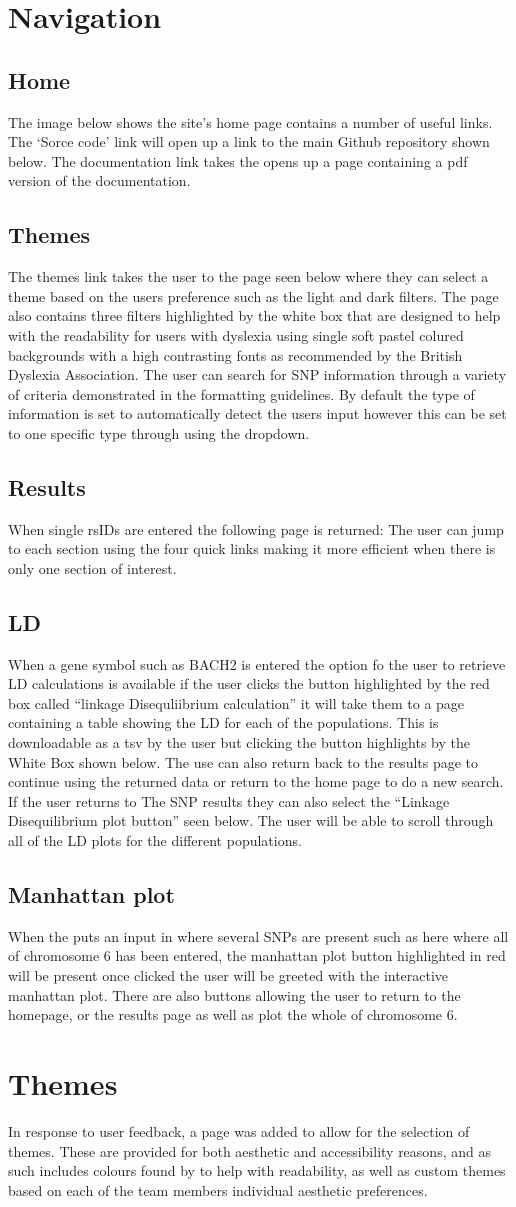 \documentclass[12pt,a4paper]{article}
\newcommand{\sect}[1]{
\clearpage
\hypertarget{#1}{
\section{#1}\label{#1}}
}
\newcommand{\subsect}[1]{
\FloatBarrier %
\hypertarget{#1}{
\subsection{#1}\label{#1}}
}
\begin{document}
\sect{Navigation}
\subsect{Home}
The image below shows the site's home page contains a number of useful links.
The ‘Sorce code’ link will open up a link to the main Github repository shown below. 
The documentation link takes the opens up a page containing a pdf version of the documentation.
\subsect{Themes}
The themes link takes the user to the page seen below where they can select a theme based on the users preference such as the light and dark filters. The page also contains three filters highlighted by the white box that are designed to help with the readability for users with dyslexia using single soft pastel colured backgrounds with a high contrasting fonts as recommended by the British Dyslexia Association.
The user can search for SNP information through a variety of criteria demonstrated in the formatting guidelines. By default the type of information is set to automatically detect the users input however this can be set to one specific type through using the dropdown.
\subsect{Results}
When single rsIDs are entered the following page is returned:
The user can jump to each section using the four quick links making it more efficient when there is only one section of interest.
\subsect{LD}
When a gene symbol such as BACH2 is entered the option fo the user to retrieve LD calculations is available if the user clicks the button highlighted by the red box called “linkage Disequliibrium calculation” it will take them to a page containing a table showing the LD for each of the populations. This is downloadable as a tsv by the user but clicking the button highlights by the White Box shown below.
The use can also return back to the results page to continue using the returned data or return to the home page to do a new search. If the user returns to The SNP results they can also select the “Linkage Disequilibrium plot button” seen below.
The user will be able to scroll through all of the LD plots for the different populations.
\subsect{Manhattan plot}
When the puts an input in where several SNPs are present such as here where all of chromosome 6 has been entered, the manhattan plot button highlighted in red will be present once clicked the user will be greeted with the interactive manhattan plot. There are also buttons allowing the user to return to the homepage, or the results page as well as plot the whole  of chromosome 6.
\sect{Themes}
In response to user feedback, a page was added to allow for the selection of themes.
These are provided for both aesthetic and accessibility reasons,
and as such includes colours found by \textcite{AccessColours} to help with readability,
as well as custom themes based on each of the team members individual aesthetic preferences.
\end{document}
